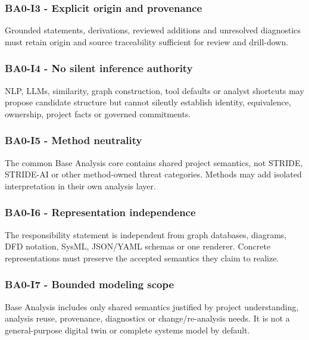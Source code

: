 \documentclass[
  10pt,
  a4paper,
]{article}
\begin{document}
\subsubsection{BA0-I3 - Explicit origin and
provenance}\label{ba0-i3---explicit-origin-and-provenance}

Grounded statements, derivations, reviewed additions and unresolved
diagnostics must retain origin and source traceability sufficient for
review and drill-down.

\subsubsection{BA0-I4 - No silent inference
authority}\label{ba0-i4---no-silent-inference-authority}

NLP, LLMs, similarity, graph construction, tool defaults or analyst
shortcuts may propose candidate structure but cannot silently establish
identity, equivalence, ownership, project facts or governed commitments.

\subsubsection{BA0-I5 - Method
neutrality}\label{ba0-i5---method-neutrality}

The common Base Analysis core contains shared project semantics, not
STRIDE, STRIDE-AI or other method-owned threat categories. Methods may
add isolated interpretation in their own analysis layer.

\subsubsection{BA0-I6 - Representation
independence}\label{ba0-i6---representation-independence}

The responsibility statement is independent from graph databases,
diagrams, DFD notation, SysML, JSON/YAML schemas or one renderer.
Concrete representations must preserve the accepted semantics they claim
to realize.

\subsubsection{BA0-I7 - Bounded modeling
scope}\label{ba0-i7---bounded-modeling-scope}

Base Analysis includes only shared semantics justified by project
understanding, analysis reuse, provenance, diagnostics or
change/re-analysis needs. It is not a general-purpose digital twin or
complete systems model by default.
\end{document}
